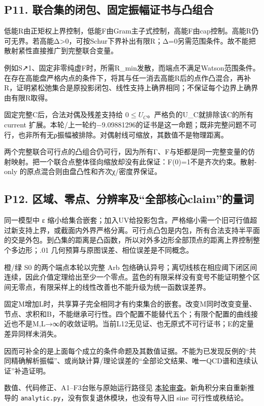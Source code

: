 \documentclass[
  11pt,
  a4paper,
]{article}
\begin{document}
\subsection{P11.
联合集的闭包、固定振幅证书与凸组合}\label{p11.-ux8054ux5408ux96c6ux7684ux95edux5305ux56faux5b9aux632fux5e45ux8bc1ux4e66ux4e0eux51f8ux7ec4ux5408}

低能R由正矩权上界控制，低能F由Gram主子式控制，高能F由cap控制。高能R仍可无界。若高能Δ\textgreater0，可按Schur下界补出有限R；Δ=0另需范围条件。故不能把散射紧性直接推广到完整联合变量。

例如S↗1、固定非零纯虚F时，所需R\_min发散，而端点不满足Watson范围条件。在存在高能盘严格内点的条件下，将其与任一消去高能R后的点作凸混合，再补R，证明紧松弛集合是原投影闭包、线性支持上确界相同；不保证每个边界上确界由有限R取得。

固定完整C后，合法对偶及残差支持给
\(0\le U_C\)。严格负的U\_C就排除该C的所有 current
扩展。本轮/上一轮约−9.09881296的证书是这一命题；既非完整问题不可行，也非所有无ρ振幅被排除。对偶射线可缩放，其数值不是物理距离。

两个完整联合可行点的凸组合仍可行，因为所有Γ、F与矩都是同一完整变量的仿射映射。把一个联合点整体径向缩放却没有此保证：F(0)=1不是齐次约束。散射-only
的原点混合则由盘凸性和齐次χ/密度界保证。

\subsection{P12.
区域、零点、分辨率及``全部核心claim''的量词}\label{p12.-ux533aux57dfux96f6ux70b9ux5206ux8fa8ux7387ux53caux5168ux90e8ux6838ux5fc3claimux7684ux91cfux8bcd}

同一模型中 ε
缩小给集合嵌套；加入UV给投影包含。严格缩小需一个旧可行值超过新支持上界，或截面内外界严格分离。可行点凸包是内包，所有合法支持半平面的交是外包。到凸集的距离是凸函数，所以对外多边形全部顶点的距离上界控制整个多边形；.01
几何预算与原图误差、相位误差是不同概念。

橙/绿 S0 的两个端点本轮以完整 Arb
包络确认异号；离切线核在相应阈下闭区间连续，因此介值定理给出至少一个零点。蓝色的有限采样没有变号不能证明整个区间无零点，有限采样上的线性改善也不能升级为统一函数误差界。

固定M增加L时，共享算子完全相同才有约束集合的嵌套。改变M同时改变变量、节点、求积和B，不能继承可行性。四个配置不能替代五个；有限个配置的曲线接近也不是M,L→∞的收敛证明。当前L12无见证、也无原式不可行证书；E的定量差异同样未消失。

因而可补全的是上面每个成立的条件命题及其数值证据。不能为已发现反例的``共同精确解析振幅''、或尚缺计算/理论误差的``全部论文结果、唯一QCD谱和连续认证''补造证明。

数值、代码修正、A1--F3台账与原始运行路径见
\href{REVIEW_ZH.md}{本轮审查}。新角积分来自重新推导的
\texttt{analytic.py}，没有恢复退休模块，也没有导入旧 sine
可行性或秩结论。
\end{document}
